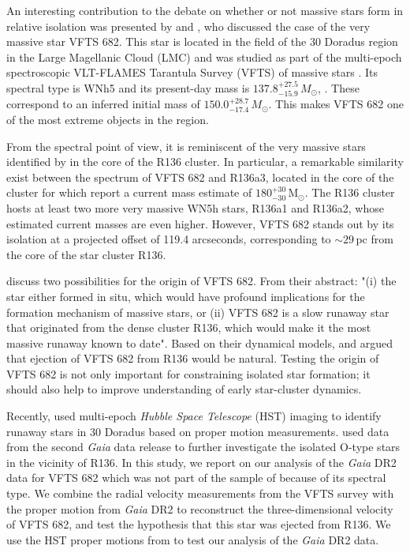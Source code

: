 \documentclass[a4paper,fleqn,usenatbib]{mnras}
\newcommand{\Msun}{{\,\mathrm{M}_\odot}}
\begin{document}
An interesting contribution to the debate on whether or not massive
stars form in relative isolation was presented by
\cite{bestenlehner:11} and \cite{bressert:12}, who discussed the case of the very massive star
VFTS 682.  This star is located in the field of the 30 Doradus region
in the Large Magellanic Cloud (LMC) and was studied as part of the
multi-epoch spectroscopic VLT-FLAMES Tarantula Survey (VFTS) of
massive stars \citep{evans:11}. Its spectral type is WNh5 and its 
present-day mass is $137.8^{+27.5}_{-15.9}\,M_\odot$,
\citep{schneider:18}. These correspond to an inferred initial mass of
$150.0^{+28.7}_{-17.4}\,M_\odot$. This makes VFTS 682 one of the
most extreme objects in the region.

From the spectral point of view, it is reminiscent of the very
massive stars %
identified by
\citet{dekoter:97,crowther:10, crowther:16} in the core of the
R136 cluster. In particular, a remarkable similarity exist between the
spectrum of VFTS 682 and R136a3, located in the core of the cluster
\citep{crowther:10} for which \citet{crowther:16} report a
current mass estimate of $180^{+30}_{-30}\Msun$. The R136 cluster hosts
at least two more very massive WN5h stars, R136a1 and R136a2, whose
estimated current masses are even higher. However, VFTS 682 stands
out by its isolation at a projected offset of 119.4 arcseconds, corresponding to $\sim$$29$\,pc from the core of the star cluster
R136.

\citet{bestenlehner:11} discuss two possibilities for the
origin of VFTS 682. %
From their abstract: "(i) the
star either formed in situ, which would have profound implications for
the formation mechanism of massive stars, or (ii) VFTS 682 is a slow
runaway star that originated from the dense cluster R136, which would
make it the most massive runaway known to date". Based on their
dynamical models, \citet{fujii:11} and \citet{banerjee:12} argued that
ejection of VFTS 682 from R136 would be natural. Testing the origin of
VFTS 682 is not only important for constraining isolated star
formation; it should also help to improve understanding of early star-cluster dynamics.

Recently, \citet{platais:15,platais:18} used multi-epoch \emph{Hubble Space
  Telescope} (HST) imaging to identify %
runaway stars in
 30 Doradus based on proper motion
measurements. \citet{lennon:18} used data from the second \emph{Gaia}
data release \cite[DR2,][]{gaia:16,brown:18} to further investigate
the isolated O-type stars in the vicinity of R136. In this study, we
report on our analysis of the \emph{Gaia} DR2 data for VFTS 682 which
was not part of the sample of \citet{lennon:18} because of its 
spectral type. We combine the radial velocity measurements from the
VFTS survey \citep[][]{evans:11} with the proper motion from
\emph{Gaia} DR2 to reconstruct the three-dimensional velocity of VFTS
682, and test the hypothesis that this star was ejected from R136. We
use the HST proper motions from \citet{platais:18} to test our
analysis of the \emph{Gaia} DR2 data.
\end{document}
